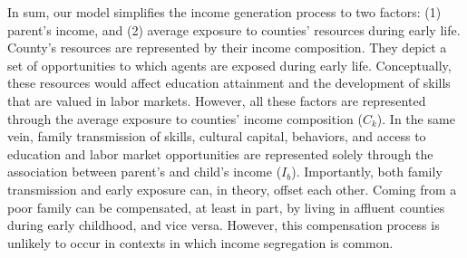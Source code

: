 \documentclass[class=article, crop=false, 12pt]{standalone}
\begin{document}



In sum, our model simplifies the income generation process to two factors: (1) parent's income, and (2) average exposure to counties' resources during early life. County's resources are represented by their income composition. They depict a set of opportunities to which agents are exposed during early life. Conceptually, these resources would affect education attainment and the development of skills that are valued in labor markets. However, all these factors are represented through the average exposure to counties' income composition ($C_k$). In the same vein, family transmission of skills, cultural capital, behaviors, and access to education and labor market opportunities are represented solely through the association between parent's and child's income ($I_b$). Importantly, both family transmission and early exposure can, in theory, offset each other. Coming from a poor family can be compensated, at least in part, by living in affluent counties during early childhood, and vice versa. However, this compensation process is unlikely to occur in contexts in which income segregation is common.

\end{document}
